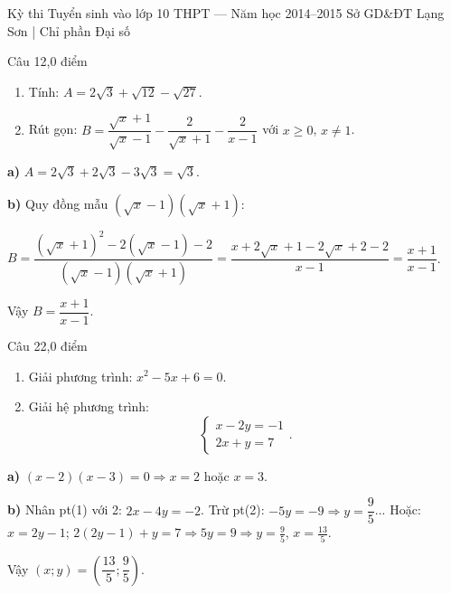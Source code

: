 ﻿%
%
  {Kỳ thi Tuyển sinh vào lớp 10 THPT — Năm học 2014--2015}%
  {Sở GD\&ĐT Lạng Sơn | Chỉ phần Đại số}

\begin{de_cau}{Câu 1}{2,0 điểm}
\begin{enumerate}[label=\alph*)]
  \item Tính: $A = 2\sqrt{3}+\sqrt{12}-\sqrt{27}$.
  \item Rút gọn: $B = \dfrac{\sqrt{x}+1}{\sqrt{x}-1}-\dfrac{2}{\sqrt{x}+1}-\dfrac{2}{x-1}$ với $x\ge0$, $x\neq1$.
\end{enumerate}
\end{de_cau}

\begin{loi_giai_cau}
\textbf{a)} $A=2\sqrt{3}+2\sqrt{3}-3\sqrt{3}=\boxed{\sqrt{3}}$.

\textbf{b)} Quy đồng mẫu $(\sqrt{x}-1)(\sqrt{x}+1)$:

$B=\dfrac{(\sqrt{x}+1)^2-2(\sqrt{x}-1)-2}{(\sqrt{x}-1)(\sqrt{x}+1)}=\dfrac{x+2\sqrt{x}+1-2\sqrt{x}+2-2}{x-1}=\dfrac{x+1}{x-1}$.

Vậy $B=\boxed{\dfrac{x+1}{x-1}}$.
\end{loi_giai_cau}

\begin{de_cau}{Câu 2}{2,0 điểm}
\begin{enumerate}[label=\alph*)]
  \item Giải phương trình: $x^2-5x+6=0$.
  \item Giải hệ phương trình:
  \[\begin{cases} x-2y=-1 \\ 2x+y=7 \end{cases}.\]
\end{enumerate}
\end{de_cau}

\begin{loi_giai_cau}
\textbf{a)} $(x-2)(x-3)=0\Rightarrow\boxed{x=2}$ hoặc $\boxed{x=3}$.

\textbf{b)} Nhân pt(1) với 2: $2x-4y=-2$. Trừ pt(2): $-5y=-9\Rightarrow y=\dfrac{9}{5}$... Hoặc: $x=2y-1$; $2(2y-1)+y=7\Rightarrow5y=9\Rightarrow y=\frac{9}{5}$, $x=\frac{13}{5}$.

Vậy $\boxed{(x;y)=\left(\dfrac{13}{5};\dfrac{9}{5}\right)}$.
\end{loi_giai_cau}

